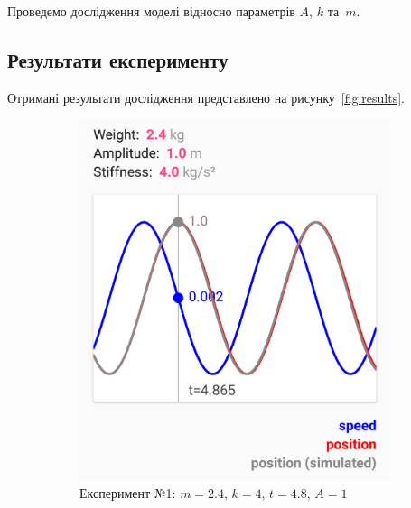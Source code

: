 Проведемо дослідження моделі відносно параметрів $A$, $k$ та~$m$. 

\subsection{Результати експерименту}
Отримані результати дослідження представлено на рисунку~\ref{fig:results}.

\begin{figure}[H]
    \centering
    \begin{subfigure}[t]{0.45\linewidth}
    	\includegraphics[width=1\linewidth]{experiment1}
    	\caption{Експеримент №1: $m = 2.4$, $k = 4$, $t = 4.8$, $A = 1$}
    \end{subfigure}
    ~
    \begin{subfigure}[t]{0.45\linewidth}

\end{subfigure}
\end{figure}
